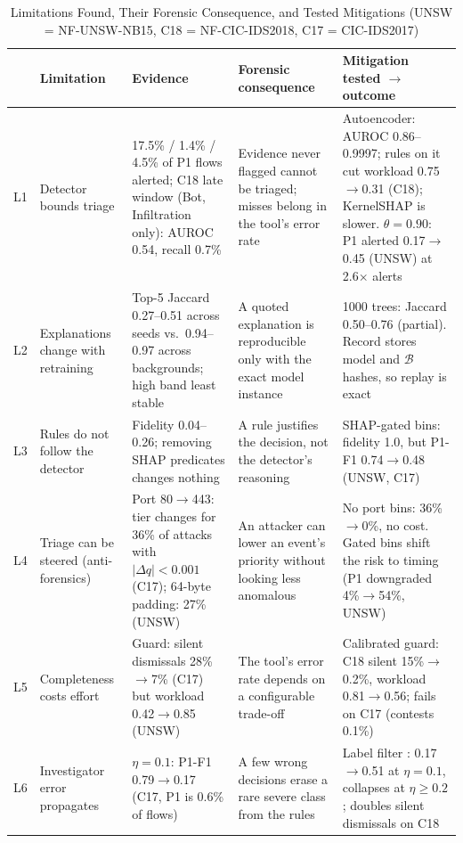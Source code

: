 \documentclass[journal]{IEEEtran}
\begin{document}
\begin{table}[t]
\centering
\caption{Limitations Found, Their Forensic Consequence, and Tested Mitigations (UNSW = NF-UNSW-NB15, C18 = NF-CIC-IDS2018, C17 = CIC-IDS2017)}
\label{tab:limits}
\scriptsize
\setlength{\tabcolsep}{3pt}
\begin{tabular}{@{}p{3mm}p{26mm}p{51mm}p{36mm}p{56mm}@{}}
\toprule
& Limitation & Evidence & Forensic consequence & Mitigation tested $\rightarrow$ outcome\\
\midrule
L1 & Detector bounds triage & 17.5\% / 1.4\% / 4.5\% of P1 flows alerted; C18 late window (Bot, Infiltration only): AUROC 0.54, recall 0.7\% & Evidence never flagged cannot be triaged; misses belong in the tool's error rate & Autoencoder: AUROC 0.86--0.9997; rules on it cut workload 0.75$\rightarrow$0.31 (C18); KernelSHAP is slower. $\theta=0.90$: P1 alerted 0.17$\rightarrow$0.45 (UNSW) at 2.6$\times$ alerts\\
L2 & Explanations change with retraining & Top-5 Jaccard 0.27--0.51 across seeds vs.\ 0.94--0.97 across backgrounds; high band least stable & A quoted explanation is reproducible only with the exact model instance & 1000 trees: Jaccard 0.50--0.76 (partial). Record stores model and $\mathcal{B}$ hashes, so replay is exact\\
L3 & Rules do not follow the detector & Fidelity 0.04--0.26; removing SHAP predicates changes nothing & A rule justifies the decision, not the detector's reasoning & SHAP-gated bins: fidelity 1.0, but P1-F1 0.74$\rightarrow$0.48 (UNSW, C17)\\
L4 & Triage can be steered (anti-forensics) & Port 80$\rightarrow$443: tier changes for 36\% of attacks with $|\Delta q|<0.001$ (C17); 64-byte padding: 27\% (UNSW) & An attacker can lower an event's priority without looking less anomalous & No port bins: 36\%$\rightarrow$0\%, no cost. Gated bins shift the risk to timing (P1 downgraded 4\%$\rightarrow$54\%, UNSW)\\
L5 & Completeness costs effort & Guard: silent dismissals 28\%$\rightarrow$7\% (C17) but workload 0.42$\rightarrow$0.85 (UNSW) & The tool's error rate depends on a configurable trade-off & Calibrated guard: C18 silent 15\%$\rightarrow$0.2\%, workload 0.81$\rightarrow$0.56; fails on C17 (contests 0.1\%)\\
L6 & Investigator error propagates & $\eta=0.1$: P1-F1 0.79$\rightarrow$0.17 (C17, P1 is 0.6\% of flows) & A few wrong decisions erase a rare severe class from the rules & Label filter \cite{brodley}: 0.17$\rightarrow$0.51 at $\eta=0.1$, collapses at $\eta\geq0.2$; doubles silent dismissals on C18\\

\end{tabular}
\end{table}
\end{document}
